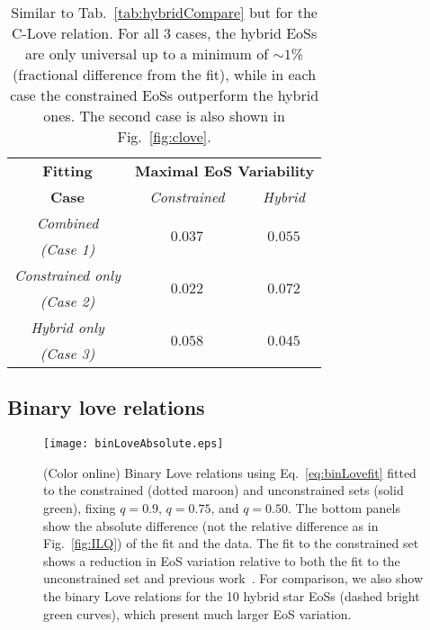 \documentclass[prd,twocolumn,nofootinbib,superscriptaddress,amsmath,amssymb]{revtex4-1}
\begin{document}
\begin{table}
\centering
\begin{tabular}{ c  || c c } 
 \hline
 \hline
 \textbf{Fitting} & \multicolumn{2}{c}{\textbf{Maximal EoS Variability}} \\
 \cline{2-3}
 \textbf{Case} &  \multicolumn{1}{c|}{\emph{Constrained}} & \emph{Hybrid}\\
 \hline
 \emph{Combined} &  \multirow{2}{*}{$0.037$} & \multirow{2}{*}{$0.055$}\\
 \emph{(Case 1)} & &\\
 \cline{1-1}
 \emph{Constrained only} & \multirow{2}{*}{$0.022$} & \multirow{2}{*}{$0.072$}\\
  \emph{(Case 2)} & &\\
  \cline{1-1}
 \emph{Hybrid only} & \multirow{2}{*}{$0.058$} & \multirow{2}{*}{$0.045$}\\
  \emph{(Case 3)} & &\\
  \cline{1-1}
\hline
\hline
\end{tabular}
\caption{
Similar to Tab.~\ref{tab:hybridCompare} but for the C-Love relation.
For all 3 cases, the hybrid EoSs are only universal up to a minimum of $\sim1$\% (fractional difference from the fit), while in each case the constrained EoSs outperform the hybrid ones. The second case is also shown in Fig.~\ref{fig:clove}.
}\label{tab:hybridCompareClove}
\end{table}


\subsection{Binary love relations}
\label{sec:binary}

\begin{figure}[htb]
\begin{center} 
\texttt{[image: binLoveAbsolute.eps]}
\end{center}
\caption{(Color online) Binary Love relations using Eq.~\ref{eq:binLovefit} fitted to the constrained (dotted maroon) and unconstrained sets (solid green), fixing $q=0.9$, $q=0.75$, and $q=0.50$. The bottom panels show the absolute difference (not the relative difference as in Fig.~\ref{fig:ILQ}) of the fit and the data. The fit to the constrained set shows a reduction in EoS variation relative to both the fit to the unconstrained set and previous work~\cite{Yagi:binLove}. For comparison, we also show the binary Love relations for the 10 hybrid star EoSs (dashed bright green curves), which present much larger EoS variation. 
}
\label{fig:binLove}
\end{figure} 
\end{document}
